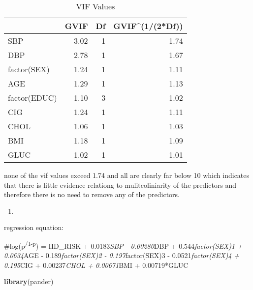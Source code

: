 \documentclass[]{article}
\newenvironment{Shaded}{\begin{snugshade}}{\end{snugshade}}
\newcommand{\DataTypeTok}[1]{\textcolor[rgb]{0.13,0.29,0.53}{#1}}
\newcommand{\DecValTok}[1]{\textcolor[rgb]{0.00,0.00,0.81}{#1}}
\newcommand{\KeywordTok}[1]{\textcolor[rgb]{0.13,0.29,0.53}{\textbf{#1}}}
\newcommand{\NormalTok}[1]{#1}
\newcommand{\OperatorTok}[1]{\textcolor[rgb]{0.81,0.36,0.00}{\textbf{#1}}}
\newcommand{\StringTok}[1]{\textcolor[rgb]{0.31,0.60,0.02}{#1}}
\begin{document}
\begin{Shaded}
\end{Shaded}

\begin{table}[t]

\caption{\label{tab:unnamed-chunk-7}VIF Values}
\centering
\begin{tabular}{l|r|r|r}
\hline
  & GVIF & Df & GVIF\textasciicircum{}(1/(2*Df))\\
\hline
SBP & 3.02 & 1 & 1.74\\
\hline
DBP & 2.78 & 1 & 1.67\\
\hline
factor(SEX) & 1.24 & 1 & 1.11\\
\hline
AGE & 1.29 & 1 & 1.13\\
\hline
factor(EDUC) & 1.10 & 3 & 1.02\\
\hline
CIG & 1.24 & 1 & 1.11\\
\hline
CHOL & 1.06 & 1 & 1.03\\
\hline
BMI & 1.18 & 1 & 1.09\\
\hline
GLUC & 1.02 & 1 & 1.01\\
\hline
\end{tabular}
\end{table}

none of the vif values exceed 1.74 and all are clearly far below 10
which indicates that there is little evidence relationg to
mulitcoliniarity of the predictors and therefore there is no need to
remove any of the predictors.

\begin{enumerate}
\def\labelenumi{\alph{enumi})}
\setcounter{enumi}{1}
\item
\end{enumerate}

regression equation:

\#log(p\textsuperscript{/1-p}) = HD\_RISK + 0.0183\emph{SBP -
0.00280}DBP + 0.544\emph{factor(SEX)1 + 0.0634}AGE -
0.189\emph{factor(SEX)2 - 0.197}factor(SEX)3 - 0.0521\emph{factor(SEX)4
+ 0.195}CIG + 0.00237\emph{CHOL + 0.00671}BMI + 0.00719*GLUC

\begin{Shaded}
\begin{Highlighting}[]
\KeywordTok{library}\NormalTok{(pander)}
\end{Highlighting}
\end{Shaded}
\end{document}
